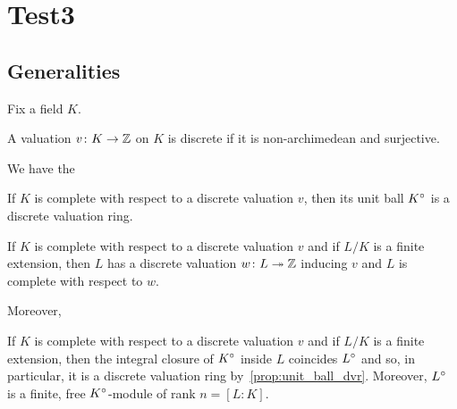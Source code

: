 %

\chapter{Test3}

\section{Generalities}
Fix a field $K$.
\begin{definition}
	\label{def:discrete-val}
	\leanok
	A valuation $v\colon K \to \mathbb{Z}$ on $K$ is discrete if it is non-archimedean and surjective.
\end{definition}

We have the

\begin{proposition}
	\label{prop:unit_ball_dvr}
	If $K$ is complete with respect to a discrete valuation $v$, then its unit ball ${K}^\circ$ is a discrete valuation ring.
\end{proposition}

\begin{lemma} 
	\label{lemma:val_L}
	If $K$ is complete with respect to a discrete valuation $v$ and if $L/K$ is a finite extension, then $L$ has a discrete valuation $w\colon L \twoheadrightarrow \mathbb{Z}$ inducing $v$ and $L$ is complete with respect to $w$.
\end{lemma}

Moreover,
\begin{proposition}
	\label{prop:unitball-L}
	If $K$ is complete with respect to a discrete valuation $v$ and if $L/K$ is a finite extension, then the integral closure of ${K}^\circ$ inside $L$ coincides ${L}^\circ$ and so, in particular, it is a discrete valuation ring by~\ref{prop:unit_ball_dvr}. Moreover, ${L}^\circ$ is a finite, free ${K}^\circ$-module of rank $n=[L:K]$.
\end{proposition}
